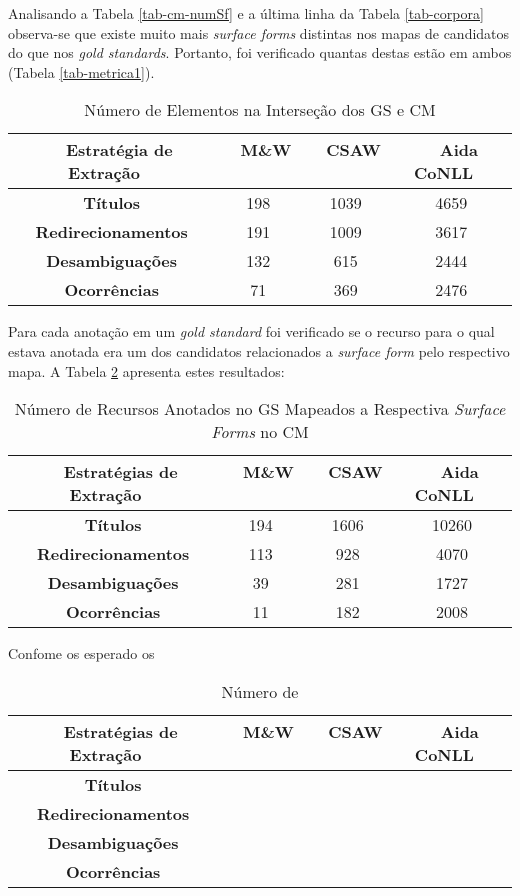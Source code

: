 \documentclass[10pt,a4paper]{llncs}
\begin{document}
{Analisando a Tabela \ref{tab-cm-numSf} e a última linha da Tabela \ref{tab-corpora} observa-se que existe muito mais \textit{surface forms} distintas nos mapas de candidatos do que nos \textit{gold standards}. Portanto, foi verificado quantas destas estão em ambos (Tabela \ref{tab-metrica1}).

\begin{table} \label{tab-}
\caption{Número de Elementos na Interseção dos GS e CM}
\centering
    \begin{tabular}{|c|c|c|c|}
    \hline
    ~ {\bf Estratégia de Extração} ~ 	& ~ {\bf M\&W} ~ 	& ~ {\bf CSAW} ~ 	& ~ {\bf Aida CoNLL} ~\\ \hline  
    {\bf Títulos} 			& 198			& 1039			& 4659 \\ \hline
    {\bf Redirecionamentos} 		& 191			& 1009			& 3617 \\ \hline
    {\bf Desambiguações} 		& 132			& 615			& 2444 \\ \hline
    {\bf Ocorrências} 			& 71			& 369			& 2476 \\ \hline
    \end{tabular}
\end{table}

Para cada anotação em um \textit{gold standard} foi verificado se o recurso para o qual estava anotada era um dos candidatos relacionados a \textit{surface form} pelo respectivo mapa. A Tabela \ref{tab-metrica2} apresenta estes resultados:
\begin{table} \label{tab-metrica2}
\caption{Número de Recursos Anotados no GS Mapeados a Respectiva \textit{Surface Forms} no CM}
\centering
    \begin{tabular}{|c|c|c|c|}
    \hline
    ~ {\bf Estratégias de Extração} ~ 	& ~ {\bf M\&W} ~ 	& ~ {\bf CSAW} ~ 	& ~ {\bf Aida CoNLL} ~\\ \hline  
    {\bf Títulos} 			& 194			& 1606			& 10260 \\ \hline
    {\bf Redirecionamentos} 		& 113			& 928			& 4070 \\ \hline
    {\bf Desambiguações} 		& 39			& 281			& 1727 \\ \hline
    {\bf Ocorrências} 			& 11			& 182			& 2008 \\ \hline
    \end{tabular}
\end{table}

Confome os esperado os 

\begin{table} \label{tab-}
\caption{Número de }
\centering
    \begin{tabular}{|c|c|c|c|}
    \hline
    ~ {\bf Estratégias de Extração} ~ 	& ~ {\bf M\&W} ~ 	& ~ {\bf CSAW} ~ 	& ~ {\bf Aida CoNLL} ~\\ \hline  
    {\bf Títulos} 			& 			& 			&  \\ \hline
    {\bf Redirecionamentos} 		& 			& 			&  \\ \hline
    {\bf Desambiguações} 		& 			& 			&  \\ \hline
    {\bf Ocorrências} 			& 			& 			&  \\ \hline
    \end{tabular}
\end{table}



}
\end{document}
